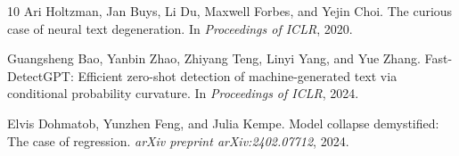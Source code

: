 \documentclass[11pt,a4paper]{article}
\begin{document}
\begin{thebibliography}{10}
Ari Holtzman, Jan Buys, Li Du, Maxwell Forbes, and Yejin Choi.
The curious case of neural text degeneration.
In \emph{Proceedings of ICLR}, 2020.

Guangsheng Bao, Yanbin Zhao, Zhiyang Teng, Linyi Yang, and Yue Zhang.
Fast-{DetectGPT}: Efficient zero-shot detection of machine-generated text via conditional probability curvature.
In \emph{Proceedings of ICLR}, 2024.

Elvis Dohmatob, Yunzhen Feng, and Julia Kempe.
Model collapse demystified: The case of regression.
\emph{arXiv preprint arXiv:2402.07712}, 2024.

\end{thebibliography}
\end{document}

